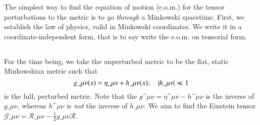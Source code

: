 




The simplest way to find the equation of motion (e.o.m.) for the tensor perturbations to the metric is to \textit{go through} a Minkowski spacetime. First, we establish the law of physics, valid in Minkowski coordinates. We write it in a coordinate-independent form, that is to say write the e.o.m. on tensorial form.  

\subsection{}
    For the time being, we take the unperturbed metric to be the flat, static Minkowskian metric such that
    \begin{equation}
        g\_{\mu\nu}(x) = \eta\_{\mu\nu} + h\_{\mu\nu}(x); \quad \abs{h\_{\mu\nu}} \ll 1
    \end{equation}
    is the full, perturbed metric. Note that the $g\^{\mu\nu}=\eta\^{\mu\nu}-h\^{\mu\nu}$ is the inverse of $g\_{\mu\nu}$, whereas $h\^{\mu\nu}$ is \emph{not} the inverse of $ h\_{\mu\nu}$. We aim to find the Einstein tensor $\mathcal{G}\_{\mu\nu} = \mathcal{R}\_{\mu\nu} - \frac{1}{2}g\_{\mu\nu} \mathcal{R}$. %

